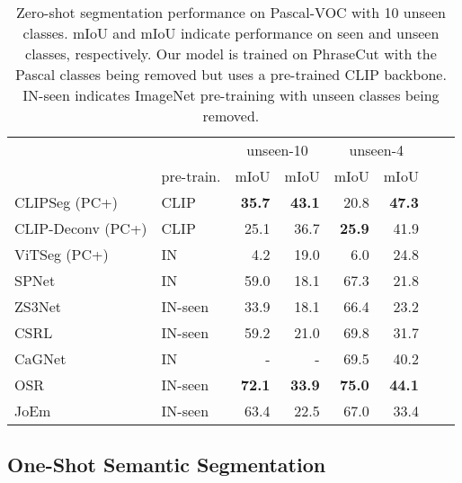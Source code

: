 \documentclass[10pt,twocolumn,letterpaper]{article}
\begin{document}
\begin{table}[]
    \centering
    \footnotesize
    \setlength{\tabcolsep}{1.5mm}
    \begin{tabular}{ll|rr|rrll}
         \toprule
         && \multicolumn{2}{c|}{unseen-10} & \multicolumn{2}{c}{unseen-4} \\
        & pre-train. & mIoU & mIoU & mIoU & mIoU  \\
        \midrule
CLIPSeg (PC+) & CLIP &  \textbf{35.7} & \textbf{43.1} & 20.8 & \textbf{47.3} \\
CLIP-Deconv (PC+) & CLIP &  25.1 & 36.7 & \textbf{25.9} & 41.9 \\
ViTSeg (PC+) & IN &  4.2 & 19.0 & 6.0 & 24.8 \\
        \midrule
        \midrule
        SPNet \cite{xian19} & IN & 59.0 & 18.1 & 67.3 & 21.8 \\
        ZS3Net \cite{bucher19} & IN-seen & 33.9 & 18.1 & 66.4 & 23.2 \\
        CSRL \cite{li20consistent}  & IN-seen  & 59.2 & 21.0 & 69.8 & 31.7  \\
        CaGNet \cite{gu2020context} & IN & - & - & 69.5 & 40.2 \\
        OSR \cite{zhang21} & IN-seen &  \textbf{72.1} & \textbf{33.9} & \textbf{75.0} & \textbf{44.1} \\
        JoEm \cite{baek21} & IN-seen & 63.4 & 22.5 & 67.0 & 33.4  \\
        \bottomrule
    \end{tabular}\caption{Zero-shot segmentation performance on Pascal-VOC with 10 unseen classes. mIoU and mIoU indicate performance on seen and unseen classes, respectively. Our model is trained on PhraseCut with the Pascal classes being removed but uses a pre-trained CLIP backbone. IN-seen indicates ImageNet pre-training with unseen classes being removed.}
    \label{tab:zero_shot_performance}
\end{table}
















\subsection{One-Shot Semantic Segmentation}
\end{document}

